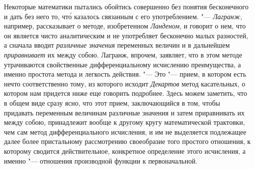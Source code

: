 Некоторые математики пытались обойтись совершенно без понятия бесконечного и
дать без него то, чт\'{о} казалось связанным с его употреблением. "---
{\em Лагранж}, например, рассказывает о методе, изобретенном {\em Ланденом}, и
говорит о нем, что он является чисто аналитическим и не употребляет бесконечно
малых разностей, а сначала вводит {\em различные значения} переменных величин и
в дальнейшем {\em приравнивает} их между собою. Лагранж, впрочем, заявляет, что
в этом методе утрачиваются свойственные дифференциальному исчислению
преимущества, а именно простота метода и легкость действия. "--- Это "---
прием, в котором есть нечто соответственно тому, из которого исходит
{\em Декартов} метод касательных, о котором нам придется ниже еще говорить
подробнее. Здесь можем заметить, что в общем виде сразу ясно, что этот прием,
заключающийся в том, чтобы придавать переменным величинам различные значения и
затем приравнивать их между собою, принадлежит вообще к другому кругу
математической трактовки, чем сам метод дифференциального исчисления, и им не
выделяется подлежащее далее более пристальному рассмотрению своеобразие того
простого отношения, к которому сводится действительное, конкретное определение
этого исчисления, а именно "--- отношения производной функции к первоначальной.

